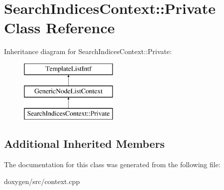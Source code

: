\hypertarget{class_search_indices_context_1_1_private}{}\section{Search\+Indices\+Context\+::Private Class Reference}
\label{class_search_indices_context_1_1_private}
Inheritance diagram for Search\+Indices\+Context\+::Private\+:\begin{figure}[H]
\begin{center}
\leavevmode
\includegraphics[height=3.000000cm]{class_search_indices_context_1_1_private}
\end{center}
\end{figure}
\subsection*{Additional Inherited Members}


The documentation for this class was generated from the following file\+:\begin{DoxyCompactItemize}
\item 
doxygen/src/context.\+cpp\end{DoxyCompactItemize}
